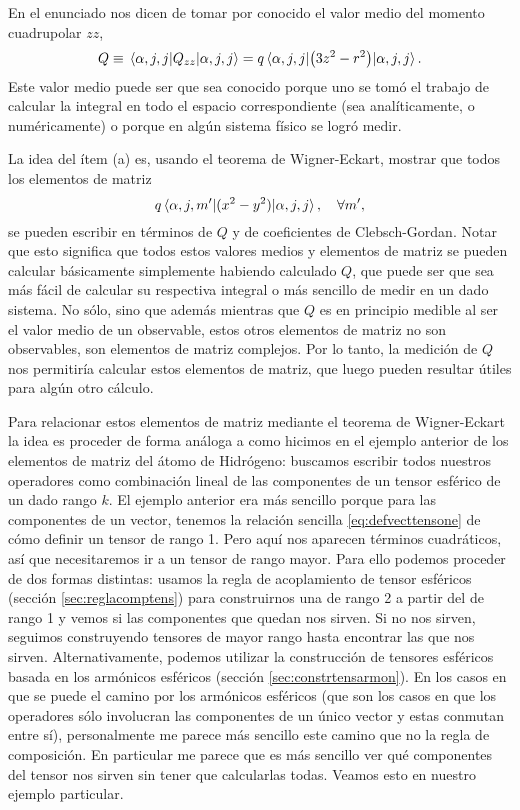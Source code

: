 \documentclass[10pt, a4paper]{article}
\numberwithin{equation}{subsection}
\begin{document}
En el enunciado nos dicen de tomar por conocido el valor medio del momento
cuadrupolar $zz$,
\begin{equation}
  Q \equiv \expval{Q_{zz}}{\alpha,j,j} = q\expval{\left(3z^2 -
    r^2\right)}{\alpha,j,j}.
\end{equation}
Este valor medio puede ser que sea conocido porque uno se tomó el trabajo de
calcular la integral en todo el espacio correspondiente (sea analíticamente, o
numéricamente) o porque en algún sistema físico se logró medir.

La idea del ítem (a) es, usando el teorema de Wigner-Eckart, mostrar que todos
los elementos de matriz
\begin{equation}
  q\matrixel{\alpha,j,m'}{(x^2 - y^2)}{\alpha,j,j}, \quad \forall m',
\end{equation}
se pueden escribir en términos de $Q$ y de coeficientes de Clebsch-Gordan.
Notar que esto significa que todos estos valores medios y elementos de matriz
se pueden calcular básicamente simplemente habiendo calculado $Q$, que puede
ser que sea más fácil de calcular su respectiva integral o más sencillo de
medir en un dado sistema. No sólo, sino que además mientras que $Q$ es en
principio medible al ser el valor medio de un observable, estos otros elementos
de matriz no son observables, son elementos de matriz complejos. Por lo tanto,
la medición de $Q$ nos permitiría calcular estos elementos de matriz, que luego
pueden resultar útiles para algún otro cálculo.

Para relacionar estos elementos de matriz mediante el teorema de Wigner-Eckart
la idea es proceder de forma análoga a como hicimos en el ejemplo anterior de
los elementos de matriz del átomo de Hidrógeno: buscamos escribir todos
nuestros operadores como combinación lineal de las componentes de un tensor
esférico de un dado rango $k$. El ejemplo anterior era más sencillo porque para
las componentes de un vector, tenemos la relación sencilla
\eqref{eq:defvecttensone} de cómo definir un tensor de rango 1. Pero aquí nos
aparecen términos cuadráticos, así que necesitaremos ir a un tensor de rango
mayor. Para ello podemos proceder de dos formas distintas: usamos la regla de
acoplamiento de tensor esféricos (sección \ref{sec:reglacomptens}) para
construirnos una de rango 2 a partir del de rango 1 y vemos si las componentes
que quedan nos sirven. Si no nos sirven, seguimos construyendo tensores de
mayor rango hasta encontrar las que nos sirven. Alternativamente, podemos
utilizar la construcción de tensores esféricos basada en los armónicos
esféricos (sección \ref{sec:constrtensarmon}). En los casos en que se puede el
camino por los armónicos esféricos (que son los casos en que los operadores
sólo involucran las componentes de un único vector y estas conmutan entre sí),
personalmente me parece más sencillo este camino que no la regla de
composición. En particular me parece que es más sencillo ver qué componentes
del tensor nos sirven sin tener que calcularlas todas. Veamos esto en nuestro
ejemplo particular.
\end{document}
